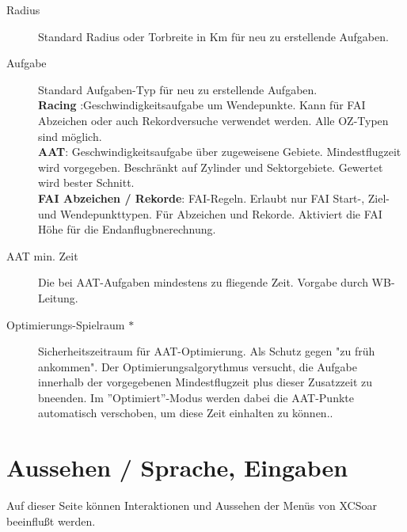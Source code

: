 \begin{description}
\item[Radius] Standard Radius oder Torbreite in Km für neu zu erstellende Aufgaben.
\item[Aufgabe] Standard Aufgaben-Typ für neu zu erstellende Aufgaben.\\
{\bf Racing }:Geschwindigkeitsaufgabe um Wendepunkte. Kann für FAI Abzeichen oder auch Rekordversuche  verwendet werden. Alle OZ-Typen sind möglich.\\
{\bf  AAT}: Geschwindigkeitsaufgabe über zugeweisene Gebiete. Mindestflugzeit wird vorgegeben. Beschränkt auf Zylinder und Sektorgebiete. Gewertet wird bester Schnitt.\\
{\bf  FAI Abzeichen / Rekorde}: FAI-Regeln. Erlaubt nur FAI Start-, Ziel- und Wendepunkttypen. Für Abzeichen und Rekorde. Aktiviert die FAI Höhe für die Endanflugbnerechnung.
\item[AAT min. Zeit] Die bei AAT-Aufgaben mindestens zu fliegende Zeit. Vorgabe durch WB-Leitung.
\item[Optimierungs-Spielraum $\ast$] Sicherheitszeitraum für AAT-Optimierung.
Als Schutz gegen "zu früh ankommen". Der Optimierungsalgorythmus versucht, die Aufgabe innerhalb der vorgegebenen Mindestflugzeit plus dieser Zusatzzeit zu bneenden.
Im ''Optimiert''-Modus  werden dabei die AAT-Punkte automatisch verschoben, um diese Zeit einhalten zu können..
\end{description}

\section{Aussehen / Sprache, Eingaben}\label{sec:interface}

Auf dieser Seite können Interaktionen und Aussehen der Menüs von \textsf{XCSoar} beeinflußt werden.


